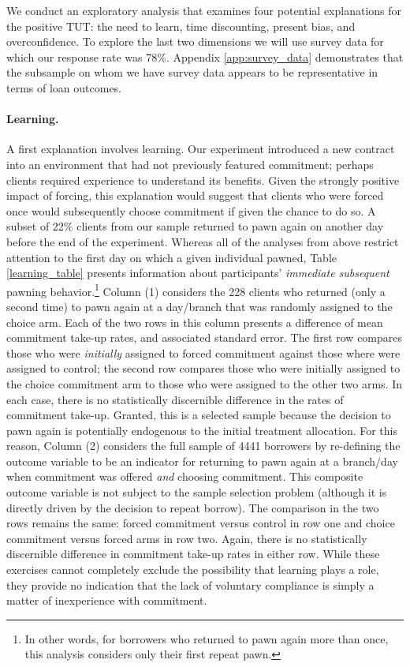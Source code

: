 \documentclass[oneside,11pt]{article}
\begin{document}
We conduct an exploratory analysis that examines four potential explanations for the positive $\text{TUT}$:  the need to learn, time discounting, present bias, and overconfidence.  To explore the last two dimensions we will use survey data for which our response rate was 78\%.  Appendix \ref{app:survey_data} demonstrates that the subsample on whom we have survey data appears to be representative in terms of loan outcomes.   


\paragraph{Learning.} A first explanation involves learning. Our experiment introduced a new contract into an environment that had not previously featured commitment; perhaps clients required experience to understand its benefits. Given the strongly positive impact of forcing, this explanation would suggest that clients who were forced once would subsequently choose commitment if given the chance to do so. 
A subset of 22\% clients from our sample returned to pawn again on another day before the end of the experiment. Whereas all of the analyses from above restrict attention to the first day on which a given individual pawned, Table \ref{learning_table} presents information about participants' \emph{immediate subsequent} pawning behavior.\footnote{In other words, for borrowers who returned to pawn again more than once, this analysis considers only their first repeat pawn.} Column (1) considers the 228 clients who returned (only a second time) to pawn again at a day/branch that was randomly assigned to the choice arm. Each of the two rows in this column presents a difference of mean commitment take-up rates, and associated standard error. The first row compares those who were \emph{initially} assigned to forced commitment against those where were assigned to control; the second row compares those who were initially assigned to the choice commitment arm to those who were assigned to the other two arms. In each case, there is no statistically discernible difference in the rates of commitment take-up. Granted, this is a selected sample because the decision to pawn again is potentially endogenous to the initial treatment allocation. For this reason, Column (2) considers the full sample of 4441 borrowers by re-defining the outcome variable to be an indicator for returning to pawn again at a branch/day when commitment was offered \emph{and} choosing commitment. This composite outcome variable is not subject to the sample selection problem (although it is directly driven by the decision to repeat borrow). The comparison in the two rows remains the same: forced commitment versus control in row one and choice commitment versus forced arms in row two. Again, there is no statistically discernible difference in commitment take-up rates in either row. While these exercises cannot completely exclude the possibility that learning plays a role, they provide no indication that the lack of voluntary compliance is simply a matter of inexperience with commitment.
\end{document}
